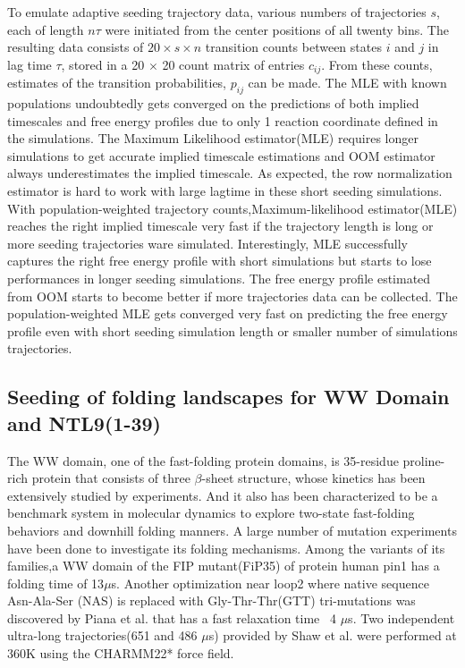 \documentclass[%
 aip,
rsi,%
 amsmath,amssymb,
 reprint,%
]{revtex4-1}
\begin{document}
To emulate adaptive seeding trajectory data, various numbers of trajectories $s$, each of length $n\tau$ were initiated from the center positions of all twenty bins.  The resulting data consists of $20 \times s \times n$ transition counts between states $i$ and $j$ in lag time $\tau$, stored in a 20 $\times$ 20 count matrix of entries $c_{ij}$.  From these counts, estimates of the transition probabilities, $p_{ij}$ can be made. The MLE with known populations undoubtedly gets converged on the predictions of  both implied timescales and free energy profiles due to only 1 reaction coordinate defined in the simulations. The Maximum Likelihood estimator(MLE) requires longer simulations to get accurate implied timescale estimations and OOM estimator always underestimates the implied timescale. As expected, the row normalization estimator is hard to work with large lagtime in these short seeding simulations. With population-weighted trajectory counts,Maximum-likelihood estimator(MLE) reaches the right implied timescale very fast if the trajectory length is long or more seeding trajectories ware simulated. Interestingly, MLE successfully captures the right free energy profile with short simulations but starts to lose performances in longer seeding simulations. The free energy profile estimated from OOM starts to become better if more trajectories data can be collected. The population-weighted MLE gets converged very fast on predicting the free energy profile even with short seeding simulation length or smaller number of simulations trajectories.       

\subsection{Seeding of folding landscapes for WW Domain and NTL9(1-39)}

The WW domain, one of the fast-folding protein domains, is 35-residue proline-rich protein that consists of three $\beta$-sheet structure, whose kinetics has been extensively studied by experiments\cite{Nguyen:2003gw,Jager:2006ga,Liu:2008fs,Dave:2016joa,Liu:2008kj}. And it also has been characterized to be a benchmark system in molecular dynamics to explore two-state fast-folding behaviors and downhill folding manners\cite{Gao:2017kna,Best:2013hua,Piana:2011gma}. A large number of mutation experiments have been done to investigate its folding mechanisms. Among the variants of its families,a WW domain of the FIP mutant(FiP35) of protein human pin1 has a folding time of 13$\mu$s\cite{HoubiNguyen:2005ec}. Another optimization near loop2 where native sequence Asn-Ala-Ser (NAS) is replaced with Gly-Thr-Thr(GTT) tri-mutations was discovered by Piana et al. that has a fast relaxation time ~4 $\mu$s\cite{Piana:2011gma}. Two independent ultra-long trajectories(651 and 486 $\mu$s) provided by Shaw et al.\cite{LindorffLarsen:2011gla} were performed at 360K using the CHARMM22* force field.
\end{document}
